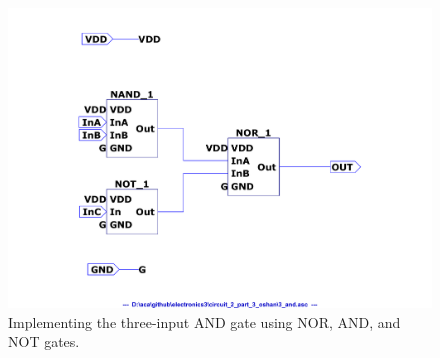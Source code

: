 \documentclass[a4paper,11pt]{article}%
\begin{document}
\begin{figure}[H]
	\centering
	\includegraphics[scale=0.5]{figures/Figure332.pdf}
	\caption{Implementing the three-input AND gate using NOR, AND, and NOT gates.}
\end{figure}


%
%

\end{document}
